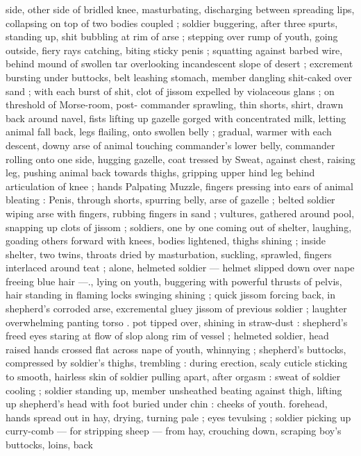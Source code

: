 side, other side of bridled knee, masturbating, discharging between 
spreading lips, collapsing on top of two bodies coupled ; soldier 
buggering, after three spurts, standing up, shit bubbling at rim of 
arse ; stepping over rump of youth, going outside, fiery rays 
catching, biting sticky penis ; squatting against barbed wire, behind 
mound of swollen tar overlooking incandescent slope of desert ; 
excrement bursting under buttocks, belt leashing stomach, member 
dangling shit-caked over sand ; with each burst of shit, clot of jissom 
expelled by violaceous glans ; on threshold of Morse-room, post- 
commander sprawling, thin shorts, shirt, drawn back around navel, 
fists lifting up gazelle gorged with concentrated milk, letting animal 
fall back, legs flailing, onto swollen belly ; gradual, warmer with each 
descent, downy arse of animal touching commander's lower belly, 
commander rolling onto one side, hugging gazelle, coat tressed by 
Sweat, against chest, raising leg, pushing animal back towards 
thighs, gripping upper hind leg behind articulation of knee ; hands 
Palpating Muzzle, fingers pressing into ears of animal bleating : 
Penis, through shorts, spurring belly, arse of gazelle ; belted soldier 
wiping arse with fingers, rubbing fingers in sand ; vultures, gathered 
around pool, snapping up clots of jissom ; soldiers, one by one 
coming out of shelter, laughing, goading others forward with knees, 
bodies lightened, thighs shining ; inside shelter, two twins, throats 
dried by masturbation, suckling, sprawled, fingers interlaced around 
teat ; alone, helmeted soldier --- helmet slipped down over nape 
freeing blue hair ---., lying on youth, buggering with powerful thrusts 
of pelvis, hair standing in flaming locks swinging shining ; quick 
jissom forcing back, in shepherd's corroded arse, excremental gluey 
jissom of previous soldier ; laughter overwhelming panting torso . 
pot tipped over, shining in straw-dust : shepherd's freed eyes staring 
at flow of slop along rim of vessel ; helmeted soldier, head raised 
hands crossed flat across nape of youth, whinnying ; shepherd's 
buttocks, compressed by soldier's thighs, trembling : during 
erection, scaly cuticle sticking to smooth, hairless skin of soldier 
pulling apart, after orgasm : sweat of soldier cooling ; soldier 
standing up, member unsheathed beating against thigh, lifting up 
shepherd's head with foot buried under chin : cheeks of youth. 
forehead, hands spread out in hay, drying, turning pale ; eyes 
tevulsing ; soldier picking up curry-comb --- for stripping sheep --- 
from hay, crouching down, scraping boy's buttocks, loins, back 

